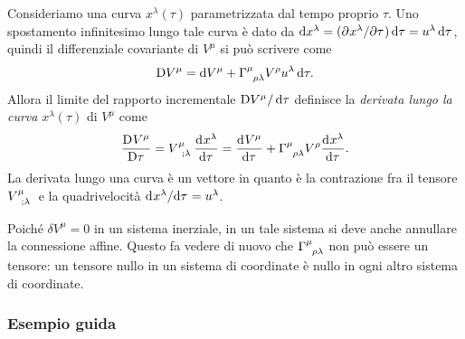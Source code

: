 Consideriamo una curva $x^{\lambda}(\tau)$ parametrizzata dal tempo proprio
$\tau$.  Uno spostamento infinitesimo lungo tale curva è dato da
$\mathop{}\!\mathrm{d} x^{\lambda} = (\partial^{} x^{\lambda} / \partial {\tau}^{}) \mathop{}\!\mathrm{d} \tau = u^{\lambda}\mathop{}\!\mathrm{d}\tau$,
quindi il differenziale covariante di $V^{\mu}$ si può scrivere come
\begin{equation}
  \cdd V^{\mu} = \dd V^{\mu} + \tensor{\Gamma}{^{\mu}_{\rho\lambda}} V^{\rho}
  u^{\lambda }\dd \tau.
\end{equation}
Allora il limite del rapporto incrementale $\mathop{}\!\mathrm{D} V^{\mu}/\mathop{}\!\mathrm{d} \tau$ definisce la
\emph{derivata lungo la curva}
$x^{\lambda}(\tau)$ di $V^{\mu}$ come
\begin{equation}
  \curder{V^{\mu}} = \tensor{V}{^{\mu}_{;\lambda}} \toder{x^{\lambda}}{\tau} =
  \toder{V^{\mu}}{\tau} + \tensor{\Gamma}{^{\mu}_{\rho\lambda}} V^{\rho}
  \toder{x^{\lambda}}{\tau}.
\end{equation}
La derivata lungo una curva è un vettore in quanto è la contrazione fra il
tensore $\tensor{V}{^{\mu}_{;\lambda}}$ e la quadrivelocità
$\mathrm{d}^{}x^{\lambda} / \mathrm{d} {\tau}^{} = u^{\lambda}$.

Poiché $\delta V^{\mu} = 0$ in un sistema inerziale, in un tale sistema si deve
anche annullare la connessione affine.  Questo fa
vedere di nuovo che $\tensor{\Gamma}{^{\mu}_{\rho\lambda}}$ non può essere un
tensore: un tensore nullo in un sistema di coordinate è nullo in ogni altro
sistema di coordinate.

\subsubsection{{Esempio guida}}
\label{sec:esempio}

